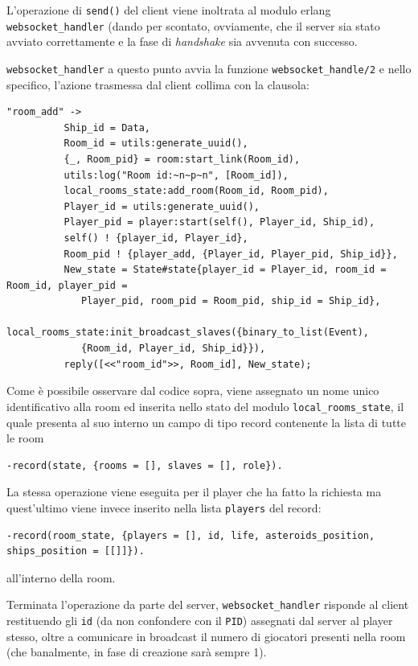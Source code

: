 \documentclass[paper=a4, fontsize=11pt]{scrartcl} %
\numberwithin{equation}{section} %
\numberwithin{figure}{section} %
\numberwithin{table}{section} %
\begin{document}
L'operazione di \texttt{send()} del client viene inoltrata al modulo erlang \texttt{websocket\_handler} (dando per scontato, ovviamente, che il server sia stato avviato correttamente e la fase di \textit{handshake} sia avvenuta con successo.

\texttt{websocket\_handler} a questo punto avvia la funzione \texttt{websocket\_handle/2} e nello specifico, l'azione trasmessa dal client collima con la clausola:
\begin{lstlisting}[basicstyle=\footnotesize]
"room_add" ->
          Ship_id = Data,
          Room_id = utils:generate_uuid(),
          {_, Room_pid} = room:start_link(Room_id),
          utils:log("Room id:~n~p~n", [Room_id]),
          local_rooms_state:add_room(Room_id, Room_pid),
          Player_id = utils:generate_uuid(),
          Player_pid = player:start(self(), Player_id, Ship_id),
          self() ! {player_id, Player_id},
          Room_pid ! {player_add, {Player_id, Player_pid, Ship_id}},
          New_state = State#state{player_id = Player_id, room_id = Room_id, player_pid =
          	 Player_pid, room_pid = Room_pid, ship_id = Ship_id},
          local_rooms_state:init_broadcast_slaves({binary_to_list(Event), 
          	 {Room_id, Player_id, Ship_id}}),
          reply([<<"room_id">>, Room_id], New_state);
\end{lstlisting}

Come è possibile osservare dal codice sopra, viene assegnato un nome unico identificativo alla room ed inserita nello stato del modulo \texttt{local\_rooms\_state}, il quale presenta al suo interno un campo di tipo record contenente la lista di tutte le room
\begin{lstlisting}[basicstyle=\footnotesize]
-record(state, {rooms = [], slaves = [], role}).
\end{lstlisting}
La stessa operazione viene eseguita per il player che ha fatto la richiesta ma quest'ultimo viene invece inserito nella lista \texttt{players} del record:
\begin{lstlisting}[basicstyle=\footnotesize]
-record(room_state, {players = [], id, life, asteroids_position, ships_position = [[]]}).
\end{lstlisting}
all'interno della room.

Terminata l'operazione da parte del server, \texttt{websocket\_handler} risponde al client restituendo gli \texttt{id} (da non confondere con il \texttt{PID}) assegnati dal server al player stesso, oltre a comunicare in broadcast il numero di giocatori presenti nella room (che banalmente, in fase di creazione sarà sempre 1).
\end{document}
